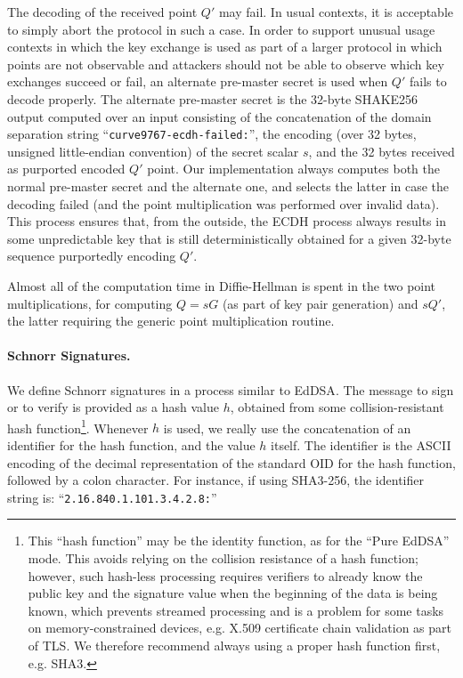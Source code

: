 \documentclass{llncs}
\begin{document}
The decoding of the received point $Q'$ may fail. In usual contexts, it
is acceptable to simply abort the protocol in such a case. In order to
support unusual usage contexts in which the key exchange is used as part
of a larger protocol in which points are not observable and attackers
should not be able to observe which key exchanges succeed or fail, an
alternate pre-master secret is used when $Q'$ fails to decode properly.
The alternate pre-master secret is the 32-byte SHAKE256 output computed
over an input consisting of the concatenation of the domain separation
string ``\verb+curve9767-ecdh-failed:+'', the encoding (over 32 bytes,
unsigned little-endian convention) of the secret scalar $s$, and the 32
bytes received as purported encoded $Q'$ point. Our implementation
always computes both the normal pre-master secret and the alternate one,
and selects the latter in case the decoding failed (and the point
multiplication was performed over invalid data). This process ensures
that, from the outside, the ECDH process always results in some
unpredictable key that is still deterministically obtained for a given
32-byte sequence purportedly encoding $Q'$.

Almost all of the computation time in Diffie-Hellman is spent in the two
point multiplications, for computing $Q = sG$ (as part of key pair
generation) and $sQ'$, the latter requiring the generic point
multiplication routine.

\paragraph{Schnorr Signatures.}

We define Schnorr signatures in a process similar to
EdDSA\cite{BerDuiLanSchYan2012,EdDSArfc8032}. The message to sign or to
verify is provided as a hash value $h$, obtained from some
collision-resistant hash function\footnote{This ``hash function'' may be
the identity function, as for the ``Pure EdDSA'' mode. This avoids
relying on the collision resistance of a hash function; however, such
hash-less processing requires verifiers to already know the public key
and the signature value when the beginning of the data is being known,
which prevents streamed processing and is a problem for some tasks on
memory-constrained devices, e.g. X.509 certificate chain validation as
part of TLS. We therefore recommend always using a proper hash function
first, e.g. SHA3.}. Whenever $h$ is used, we really use the
concatenation of an identifier for the hash function, and the value $h$
itself. The identifier is the ASCII encoding of the decimal
representation of the standard OID for the hash function, followed by a
colon character. For instance, if using SHA3-256, the identifier string
is: ``\verb+2.16.840.1.101.3.4.2.8:+''
\end{document}
